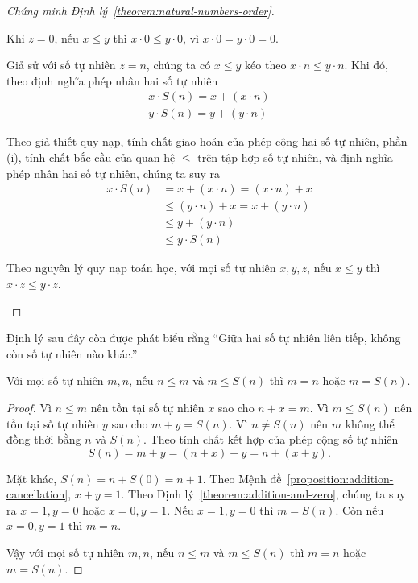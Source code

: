 \begin{proof}[Chứng minh Định lý~\ref{theorem:natural-numbers-order}]
\begin{enumerate}[label={(\roman*)}]
              Khi $z = 0$, nếu $x\leq y$ thì $x\cdot 0\leq y\cdot 0$, vì $x\cdot 0 = y\cdot 0 = 0$.

              Giả sử với số tự nhiên $z = n$, chúng ta có $x\leq y$ kéo theo $x\cdot n\leq y\cdot n$. Khi đó, theo định nghĩa phép nhân hai số tự nhiên
              \[
                  \begin{split}
                      x\cdot S(n) = x + (x\cdot n) \\
                      y\cdot S(n) = y + (y\cdot n)
                  \end{split}
              \]

              Theo giả thiết quy nạp, tính chất giao hoán của phép cộng hai số tự nhiên, phần (i), tính chất bắc cầu của quan hệ $\leq$ trên tập hợp số tự nhiên, và định nghĩa phép nhân hai số tự nhiên, chúng ta suy ra
              \begin{align*}
                  x\cdot S(n) & = x + (x\cdot n) = (x\cdot n) + x    \\
                              & \leq (y\cdot n) + x = x + (y\cdot n) \\
                              & \leq y + (y\cdot n)                  \\
                              & \leq y\cdot S(n)
              \end{align*}

              Theo nguyên lý quy nạp toán học, với mọi số tự nhiên $x, y, z$, nếu $x\leq y$ thì $x\cdot z\leq y\cdot z$.
    \end{enumerate}
\end{proof}

Định lý sau đây còn được phát biểu rằng ``Giữa hai số tự nhiên liên tiếp, không còn số tự nhiên nào khác.''
\begin{theorem}
    Với mọi số tự nhiên $m, n$, nếu $n\leq m$ và $m \leq S(n)$ thì $m = n$ hoặc $m = S(n)$.
\end{theorem}

\begin{proof}
    Vì $n\leq m$ nên tồn tại số tự nhiên $x$ sao cho $n + x = m$. Vì $m\leq S(n)$ nên tồn tại số tự nhiên $y$ sao cho $m + y = S(n)$. Vì $n\ne S(n)$ nên $m$ không thể đồng thời bằng $n$ và $S(n)$. Theo tính chất kết hợp của phép cộng số tự nhiên
    \[
        S(n) = m + y = (n + x) + y = n + (x + y).
    \]

    Mặt khác, $S(n) = n + S(0) = n + 1$. Theo Mệnh đề~\ref{proposition:addition-cancellation}, $x + y = 1$. Theo Định lý~\ref{theorem:addition-and-zero}, chúng ta suy ra $x = 1, y = 0$ hoặc $x = 0, y = 1$. Nếu $x = 1, y = 0$ thì $m = S(n)$. Còn nếu $x = 0, y = 1$ thì $m = n$.

    Vậy với mọi số tự nhiên $m, n$, nếu $n\leq m$ và $m \leq S(n)$ thì $m = n$ hoặc $m = S(n)$.
\end{proof}

